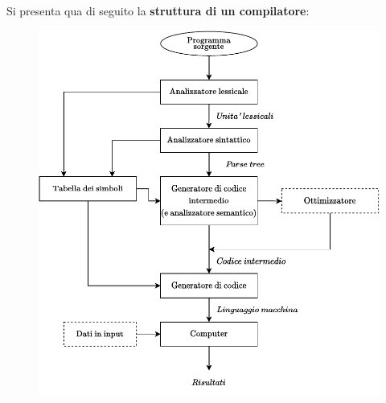 \documentclass[a4paper]{article}
\begin{document}
	\noindent
	Si presenta qua di seguito la \textbf{struttura di un compilatore}:
	\begin{figure}[!htp]
		\centering
		\includegraphics[width=\textwidth]{img/ex1-4.pdf}
	\end{figure}\newpage
	
\end{document}
